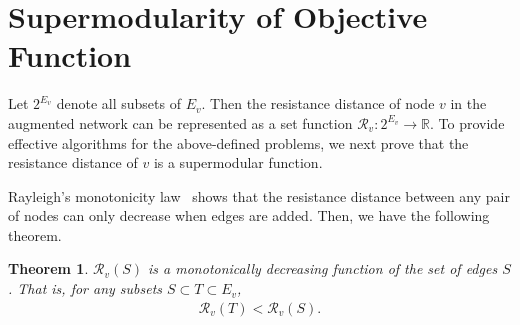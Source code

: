 \documentclass{article}
\newcommand{\rea}{\mathbb{R}}
\newtheorem{theorem}[theo]{Theorem}
\begin{document}
\section{Supermodularity of Objective Function}

Let $2^{E_v}$ denote all subsets of $E_v$. Then the resistance distance of  node $v$ in the augmented network can be represented as a set function $\mathcal{R}_v : 2^{E_v} \to \rea$.
To provide effective algorithms for the above-defined problems, we next prove that the resistance distance of $v$ is a supermodular function. \par

Rayleigh’s  monotonicity law~\cite{DoSn84} shows that the resistance distance between any pair of nodes can only decrease when edges are added. Then, we have the following theorem.
\begin{theorem}\label{thm:MI}
$\mathcal{R}_v(S)$ is a monotonically decreasing function of the set of edges $S$. That is, for any subsets $S \subset T \subset E_v$,
\begin{align*}
\mathcal{R}_v(T) < \mathcal{R}_v(S).
\end{align*}
\end{theorem}
\end{document}
